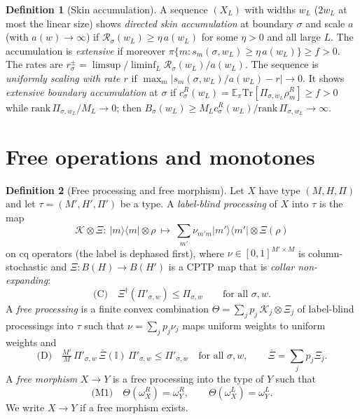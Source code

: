 \documentclass[11pt]{article}
\theoremstyle{definition}
\newtheorem{definition}{Definition}
\theoremstyle{remark}
\newcommand{\Tr}{\mathrm{Tr}}
\newcommand{\E}{\mathbb{E}}
\newcommand{\one}{\mathbb{I}}
\newcommand{\proj}[1]{|#1\rangle\!\langle #1|}
\begin{document}
\begin{definition}[Skin accumulation]\label{def:phys}
A sequence $(X_L)$ with widths $w_L$ ($2w_L$ at most the linear size) shows \emph{directed skin accumulation} at boundary $\sigma$ and scale $a$ (with $a(w)\to\infty$) if $\mathcal R_\sigma(w_L)\ge\eta\,a(w_L)$ for some $\eta>0$ and all large $L$. The accumulation is \emph{extensive} if moreover $\pi\{m:s_m(\sigma,w_L)\ge\eta\, a(w_L)\}\ge f>0$. The rates are $r^\pm_\sigma=\limsup/\liminf_L\mathcal R_\sigma(w_L)/a(w_L)$. The sequence is \emph{uniformly scaling with rate $r$} if $\max_m|s_m(\sigma,w_L)/a(w_L)-r|\to0$. It shows \emph{extensive boundary accumulation} at $\sigma$ if $c^R_\sigma(w_L)=\E_\pi\Tr[\Pi_{\sigma,w_L}\rho^R_m]\ge f>0$ while $\mathrm{rank}\,\Pi_{\sigma,w_L}/M_L\to0$; then $B_\sigma(w_L)\ge M_Lc^R_\sigma(w_L)/\mathrm{rank}\,\Pi_{\sigma,w_L}\to\infty$.
\end{definition}

\section{Free operations and monotones}
\label{sec:rt}

\begin{definition}[Free processing and free morphism]\label{def:mor}
Let $X$ have type $(M,H,\Pi)$ and let $\tau=(M',H',\Pi')$ be a type. A \emph{label-blind processing} of $X$ into $\tau$ is the map
\[
\mathcal K\otimes\Xi:\ \proj m\otimes\rho\ \mapsto\ \textstyle\sum_{m'}\nu_{m'm}\proj{m'}\otimes\Xi(\rho)
\]
on cq operators (the label is dephased first), where $\nu\in[0,1]^{M'\times M}$ is column-stochastic and $\Xi:B(H)\to B(H')$ is a CPTP map that is \emph{collar non-expanding}:
\[
\text{(C)}\quad \Xi^\dagger(\Pi'_{\sigma,w})\le\Pi_{\sigma,w}\qquad\text{for all }\sigma,w .
\]
A \emph{free processing} is a finite convex combination $\Theta=\sum_jp_j\,\mathcal K_j\otimes\Xi_j$ of label-blind processings into $\tau$ such that $\nu=\sum_jp_j\nu_j$ maps uniform weights to uniform weights and
\[
\text{(D)}\quad \tfrac{M'}{M}\,\Pi'_{\sigma,w}\,\bar\Xi(\one)\,\Pi'_{\sigma,w}\le\Pi'_{\sigma,w}\quad\text{for all }\sigma,w,\qquad \bar\Xi=\textstyle\sum_jp_j\Xi_j .
\]
A \emph{free morphism} $X\to Y$ is a free processing into the type of $Y$ such that
\[
\text{(M1)}\quad \Theta(\omega^R_X)=\omega^R_Y,\qquad \Theta(\omega^L_X)=\omega^L_Y .
\]
We write $X\to Y$ if a free morphism exists.
\end{definition}
\end{document}
